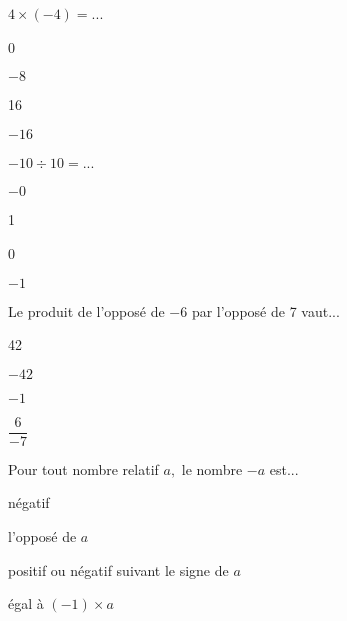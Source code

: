 \begin{QCM}
\begin{GroupeQCM}
\begin{exercice}
$4 \times (-4) =$...
\begin{ChoixQCM}{4}
\item 0
\item $-8$
\item 16
\item $-16$
\end{ChoixQCM}
\begin{corrige}
\end{corrige}
\end{exercice}


\begin{exercice}
$-10 \div 10 =$...
\begin{ChoixQCM}{4}
\item $-0$
\item 1
\item 0
\item $-1$
\end{ChoixQCM}
\begin{corrige}
\end{corrige}
\end{exercice}


\begin{exercice}
Le produit de l'opposé de $-6$ par l'opposé de 7 vaut...
\begin{ChoixQCM}{4}
\item 42
\item $-42$
\item $-1$
\item $\dfrac{6}{-7}$
\end{ChoixQCM}
\begin{corrige}
\end{corrige}
\end{exercice}


\begin{exercice}
Pour tout nombre relatif $a,$ le nombre $-a$ est...
\begin{ChoixQCM}{4}
\item négatif
\item l'opposé de $a$
\item positif ou négatif suivant le signe de $a$
\item égal à $(-1) \times a$
\end{ChoixQCM}
\begin{corrige}
\end{corrige}
\end{exercice}

\end{GroupeQCM}
\end{QCM}


